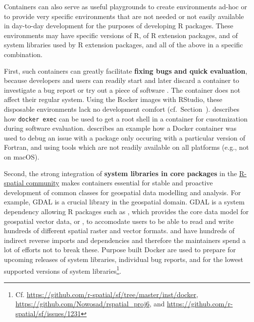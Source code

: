 \label{development}

Containers can also serve as useful playgrounds to create environments
ad-hoc or to provide very specific environments that are not needed or
not easily available in day-to-day development for the purposes of
developing R packages. These environments may have specific versions of
R, of R extension packages, and of system libraries used by R extension
packages, and all of the above in a specific combination.

First, such containers can greatly facilitate \textbf{fixing bugs and
quick evaluation}, because developers and users can readily start and
later discard a container to investigate a bug report or try out a piece
of software \citep[cf.][]{ooms_opencpu_2017}. The container does not
affect their regular system. Using the Rocker images with RStudio, these
disposable environments lack no development comfort
(cf.~Section~). \citet{ooms_opencpu_2017} describes
how \texttt{docker\ exec} can be used to get a root shell in a container
for cusotmization during software evaluation.
\citet{eddelbuettel_debugging_2019} describes an example how a Docker
container was used to debug an issue with a package only occuring with a
particular version of Fortran, and using tools which are not readily
available on all platforms (e.g., not on macOS).

Second, the strong integration of \textbf{system libraries in core
packages} in the \href{https://www.r-spatial.org/}{R-spatial community}
makes containers essential for stable and proactive development of
common classes for geospatial data modelling and analysis. For example,
GDAL \citep{gdal_2019} is a crucial library in the geospatial domain.
GDAL is a system dependency allowing R packages such as ,
which provides the core data model for geospatial vector data, or
, to accomodate users to be able to read and write
hundreds of different spatial raster and vector formats. 
and  have hundreds of indirect reverse imports and
dependencies and therefore the maintainers spend a lot of efforts not to
break these. Purpose built Docker are used to prepare for upcoming
releases of system libraries, individual bug reports, and for the lowest
supported versions of system
libraries\footnote{Cf. \href{https://github.com/r-spatial/sf/tree/master/inst/docker}{https://github.com/r-spatial/sf/tree/master/inst/docker}, \href{https://github.com/Nowosad/rspatial_proj6}{https://github.com/Nowosad/rspatial\_proj6}, and \href{https://github.com/r-spatial/sf/issues/1231}{https://github.com/r-spatial/sf/issues/1231}}.

